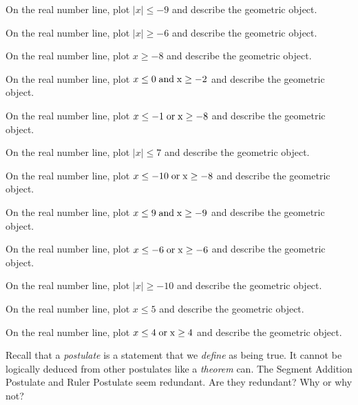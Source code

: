 \documentclass[12pt]{article}
\newenvironment{problem}[2][Problem]{\begin{trivlist}
			\item[\hskip \labelsep {\bfseries #1}\hskip \labelsep {\bfseries #2.}]}{\end{trivlist}}
\begin{document}
			\begin{problem}{0} 
On the real number line, plot $\mid x\mid \leq -9$ and describe the geometric object.
 \end{problem}\begin{problem}{1} 
On the real number line, plot $\mid x\mid \geq -6$ and describe the geometric object.
 \end{problem}\begin{problem}{2} 
On the real number line, plot $x \geq -8$ and describe the geometric object.
 \end{problem}\begin{problem}{3} 
On the real number line, plot $ x \leq 0 \;\rm{ and }\; x \geq -2$ and describe the geometric object.
 \end{problem}\begin{problem}{4} 
On the real number line, plot $ x \leq -1 \;\rm{ or }\; x \geq -8$ and describe the geometric object.
 \end{problem}\begin{problem}{5} 
On the real number line, plot $\mid x\mid \leq 7$ and describe the geometric object.
 \end{problem}\begin{problem}{6} 
On the real number line, plot $ x \leq -10 \;\rm{ or }\; x \geq -8$ and describe the geometric object.
 \end{problem}\begin{problem}{7} 
On the real number line, plot $ x \leq 9 \;\rm{ and }\; x \geq -9$ and describe the geometric object.
 \end{problem}\begin{problem}{8} 
On the real number line, plot $ x \leq -6 \;\rm{ or }\; x \geq -6$ and describe the geometric object.
 \end{problem}\begin{problem}{9} 
On the real number line, plot $\mid x\mid \geq -10$ and describe the geometric object.
 \end{problem}\begin{problem}{10} 
On the real number line, plot $x \leq 5$ and describe the geometric object.
 \end{problem}\begin{problem}{11} 
On the real number line, plot $ x \leq 4 \;\rm{ or }\; x \geq 4$ and describe the geometric object.
 \end{problem}\begin{problem}{Challenge} 

Recall that a \textit{postulate} is a statement that we \textit{define} as being true. It cannot
be logically deduced from other postulates like a \textit{theorem} can.
The Segment Addition Postulate and Ruler Postulate seem redundant. Are they redundant? Why or why not?

 \end{problem}
\end{document}
